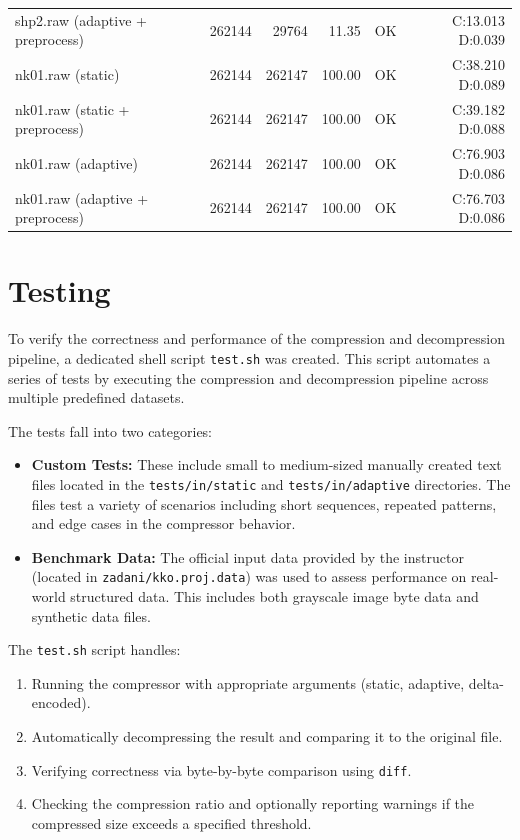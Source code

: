 \documentclass[a4paper,12pt]{article}
\begin{document}
{\begin{tabular}{lrrrrr}
            shp2.raw (adaptive + preprocess)   & 262144       & 29764          & 11.35      & OK  & C:13.013 D:0.039 \\
            nk01.raw (static)                  & 262144       & 262147         & 100.00     & OK  & C:38.210 D:0.089 \\
            nk01.raw (static + preprocess)     & 262144       & 262147         & 100.00     & OK  & C:39.182 D:0.088 \\
            nk01.raw (adaptive)                & 262144       & 262147         & 100.00     & OK  & C:76.903 D:0.086 \\
            nk01.raw (adaptive + preprocess)   & 262144       & 262147         & 100.00     & OK  & C:76.703 D:0.086 \\
            \hline
        \end{tabular}
    }




    \section{Testing}

    To verify the correctness and performance of the compression and decompression pipeline, a dedicated shell script \texttt{test.sh} was created. This script automates a series of tests by executing the compression and decompression pipeline across multiple predefined datasets.

    The tests fall into two categories:

    \begin{itemize}
        \item \textbf{Custom Tests:} These include small to medium-sized manually created text files located in the \texttt{tests/in/static} and \texttt{tests/in/adaptive} directories. The files test a variety of scenarios including short sequences, repeated patterns, and edge cases in the compressor behavior.

        \item \textbf{Benchmark Data:} The official input data provided by the instructor (located in \texttt{zadani/kko.proj.data}) was used to assess performance on real-world structured data. This includes both grayscale image byte data and synthetic data files.
    \end{itemize}

    The \texttt{test.sh} script handles:
    \begin{enumerate}
        \item Running the compressor with appropriate arguments (static, adaptive, delta-encoded).
        \item Automatically decompressing the result and comparing it to the original file.
        \item Verifying correctness via byte-by-byte comparison using \texttt{diff}.
        \item Checking the compression ratio and optionally reporting warnings if the compressed size exceeds a specified threshold.
    \end{enumerate}
\end{document}
